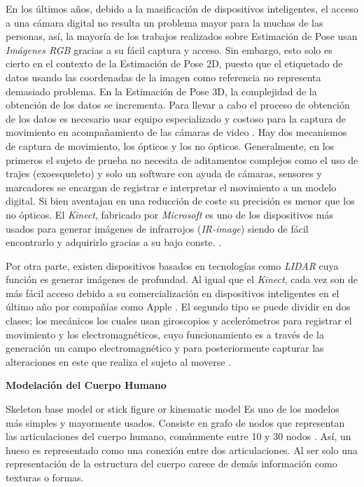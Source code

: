 En los últimos años, debido a la masificación
de dispositivos inteligentes, el acceso a una cámara digital no resulta un problema mayor para la muchas
de las personas, así, la mayoría de los trabajos realizados sobre Estimación de Pose usan
\textit{Imágenes RGB} gracias a su fácil captura y acceso.
Sin embargo, esto solo es cierto en el contexto de la Estimación de Pose 2D, puesto que el etiquetado de datos
usando las coordenadas de la imagen como referencia no representa demasiado problema. En la
Estimación de Pose 3D, la complejidad de la obtención de los datos se incrementa. Para llevar a cabo
el proceso de obtención de los datos es necesario usar equipo especializado y costoso para la captura
de movimiento en acompañamiento de las cámaras de video \cite{6682899}. Hay dos mecanismos de captura
de movimiento, los ópticos y los no ópticos. Generalmente, en los primeros el sujeto de prueba no
necesita de aditamentos complejos como el uso de trajes
(exoesqueleto) y solo un software con ayuda de cámaras, sensores y marcadores se
encargan de registrar e interpretar el movimiento a un modelo digital. Si bien
aventajan en una reducción de coste su precisión es menor que los no ópticos.
El \textit{Kinect}, fabricado por \textit{Microsoft} es uno de los dispositivos más usados
para generar imágenes de infrarrojos (\textit{IR-image}) siendo de fácil encontrarlo y adquirirlo
gracias a su bajo conste. \cite{6165146} \cite{Izadi11kinectfusion:real-time}.

Por otra parte, existen dispositivos basados en tecnologías como \textit{LIDAR} cuya función es
generar imágenes de profundad. Al igual que el \textit{Kinect}, cada vez son de más fácil acceso
debido a su comercialización en dispositivos inteligentes en el último año por compañías como Apple
\cite{DBLP:journals/corr/abs-1711-06396}. El segundo tipo se puede dividir en dos clases;
los mecánicos los cuales usan giroscopios y acelerómetros para registrar el
movimiento y los electromagnéticos, cuyo funcionamiento es a través de la generación un campo
electromagnético y para posteriormente capturar las alteraciones en este que realiza el sujeto al
moverse \cite{articleMotion}.


\textbf{Modelación del Cuerpo Humano}

Skeleton base model or stick figure or kinematic model
Es uno de los modelos más simples y mayormente usados. Consiste en grafo de nodos que representan
las articulaciones del cuerpo humano, comúnmente entre 10 y 30 nodos \cite{Felzenszwalb2005}.
Así, un hueso es representado como una conexión entre dos articulaciones. Al ser solo una
representación de la estructura del cuerpo carece de demás información como texturas o formas.


